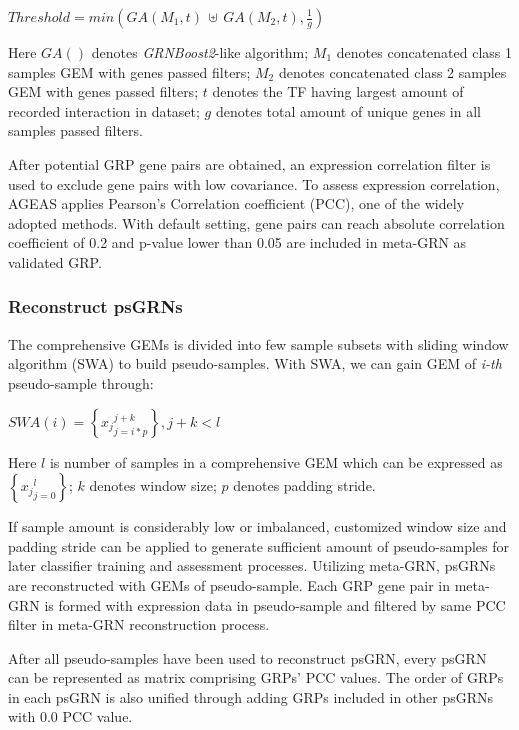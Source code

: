 \documentclass[fleqn,10pt]{wlscirep}
\begin{document}
      \centerline{$Threshold = min(GA(M_1, t)\, \uplus \, GA(M_2, t), \frac{1}{g})$}

      \noindent Here $GA()$ denotes \emph{GRNBoost2}\cite{grnboost2}-like algorithm;
      $M_1$ denotes concatenated class 1 samples GEM with genes passed filters;
      $M_2$ denotes concatenated class 2 samples GEM with genes passed filters;
      $t$ denotes the TF having largest amount of recorded interaction in dataset;
      $g$ denotes total amount of unique genes in all samples passed filters.

      After potential GRP gene pairs are obtained, an expression correlation filter is used to exclude gene pairs with low covariance.
      To assess expression correlation, AGEAS applies Pearson's Correlation coefficient\cite{pcc_2012} (PCC), one of the widely adopted methods.\cite{cid_2019}
      With default setting, gene pairs can reach absolute correlation coefficient of 0.2 and p-value lower than 0.05 are included in meta-GRN as validated GRP.

    \subsubsection*{Reconstruct psGRNs}
      The comprehensive GEMs is divided into few sample subsets with sliding window algorithm (SWA) to build pseudo-samples.
      With SWA, we can gain GEM of \emph{i-th} pseudo-sample through:

      \centerline{$SWA(i) = \left\{{x_j}_{j = i * p}^{j + k}\right\}, j + k < l$}

      \noindent Here $l$ is number of samples in a comprehensive GEM which can be expressed as $\left\{{x_j}_{j = 0}^{l}\right\}$; $k$ denotes window size; $p$ denotes padding stride.

      If sample amount is considerably low or imbalanced, customized window size and padding stride can be applied to generate sufficient amount of pseudo-samples for later classifier training and assessment processes.
      Utilizing meta-GRN, psGRNs are reconstructed with GEMs of pseudo-sample.
      Each GRP gene pair in meta-GRN is formed with expression data in pseudo-sample and filtered by same PCC filter in meta-GRN reconstruction process.

      After all pseudo-samples have been used to reconstruct psGRN, every psGRN can be represented as matrix comprising GRPs' PCC values.
      The order of GRPs in each psGRN is also unified through adding GRPs included in other psGRNs with 0.0 PCC value.
\end{document}
